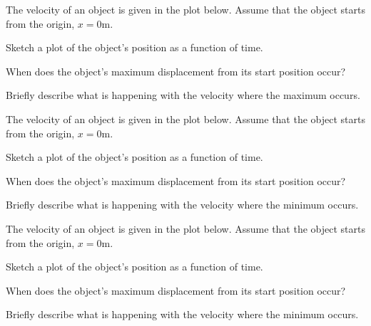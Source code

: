 \begin{problem}
\item The velocity of an object is given in the plot below. Assume
  that the object starts from the origin, $x=0$m.

  \scalebox{0.7}{}

  \begin{subproblem}
  \item Sketch a plot of the object's position as a function of time.
  \item When does the object's maximum displacement from its start
    position occur?
    \vspace{3em}
  \item Briefly describe what is happening with the velocity where the
    maximum occurs.
    \vfill
  \end{subproblem}

  \clearpage

\item The velocity of an object is given in the plot below. Assume
  that the object starts from the origin, $x=0$m.

  \scalebox{0.7}{}

  \begin{subproblem}
  \item Sketch a plot of the object's position as a function of time.
  \item When does the object's maximum displacement from its start
    position occur?
    \vspace{3em}
  \item Briefly describe what is happening with the velocity where the
    minimum occurs.
    \vfill
  \end{subproblem}

  \clearpage

\item The velocity of an object is given in the plot below. Assume
  that the object starts from the origin, $x=0$m.

  \scalebox{0.7}{}

  \begin{subproblem}
  \item Sketch a plot of the object's position as a function of time.
  \item When does the object's maximum displacement from its start
    position occur?
    \vspace{3em}
  \item Briefly describe what is happening with the velocity where the
    minimum occurs.
    \vfill
  \end{subproblem}

\end{problem}

